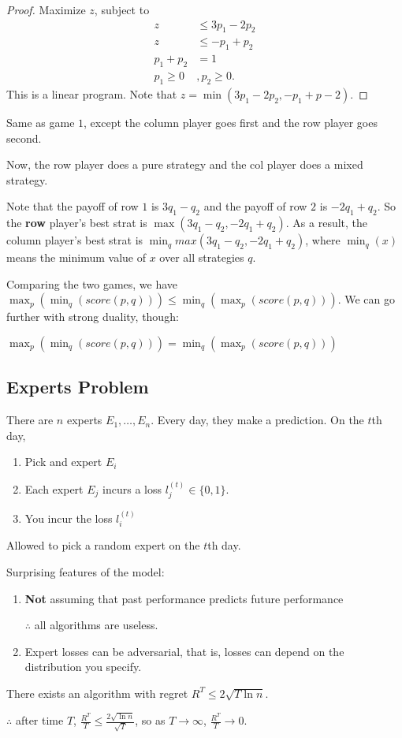 \documentclass{article}
\begin{document}
\begin{proof}
    Maximize $z$, subject to 
    \begin{align*}
        z &\leq 3p_1 - 2p_2 \\
        z &\leq -p_1 + p_2 \\
        p_1 + p_2 &= 1 \\
        p_1 \geq 0&, p_2 \geq 0.
    \end{align*}
    This is a linear program. Note that $z = \min(3p_1 - 2p_2, -p_1 + p-2)$.
\end{proof}

\begin{example}[Game 2]
    Same as game $1$, except the column player goes first and the row player goes second.
\end{example}

Now, the row player does a pure strategy and the col player does a mixed strategy.

Note that the payoff of row $1$ is $3q_1 - q_2$ and the payoff of row $2$ is $-2q_1 + q_2$. So the \textbf{row} player's best strat is $\max (3q_1 - q_2, -2q_1 + q_2)$. As a result, the column player's best strat is $\min_q max(3q_1 - q_2, -2q_1 + q_2)$, where $\min_q(x)$ means the minimum value of $x$ over all strategies $q$.

Comparing the two games, we have $\max_p(\min_q(score(p, q))) \leq \min_q(\max_p(score(p, q)))$. We can go further with strong duality, though:

\begin{theorem}
    $\max_p(\min_q(score(p, q))) = \min_q(\max_p(score(p, q)))$
\end{theorem}

\subsection{Experts Problem}
There are $n$ experts $E_1, \ldots, E_n$. Every day, they make a prediction. On the $t$th day, 
\begin{enumerate}
    \item Pick and expert $E_i$
    \item Each expert $E_j$ incurs a loss $l_j^{(t)} \in \{0, 1\}$. 
    \item You incur the loss $l_i^{(t)}$
\end{enumerate}

Allowed to pick a random expert on the $t$th day.

\begin{remark}
Surprising features of the model:
\begin{enumerate}
    \item \textbf{Not} assuming that past performance predicts future performance

    $\therefore$ all algorithms are useless.
    \item Expert losses can be adversarial, that is, losses can depend on the distribution you specify.
\end{enumerate}
\end{remark}

\begin{theorem}
    There exists an algorithm with regret $R^T \leq 2 \sqrt{T \ln n}$.

    $\therefore$ after time $T$,  $\frac{R^T}{T} \leq \frac{2 \sqrt{\ln n}}{\sqrt T}$, so as $T \to \infty$, $\frac{R^T}{T} \to 0$.
\end{theorem}
\end{document}
